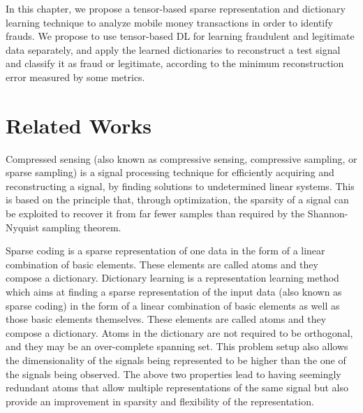 In this chapter, we propose a tensor-based sparse representation and dictionary learning technique to analyze mobile money transactions in order to identify frauds. We propose to use tensor-based DL for learning fraudulent and legitimate data separately, and apply the learned dictionaries to reconstruct a test signal and classify it as fraud or legitimate, according to the minimum reconstruction error measured by some metrics.


\section{Related Works}
\label{sec:4_relatedworks}


Compressed sensing (also known as compressive sensing, compressive sampling, or sparse sampling) is a signal processing technique for efficiently acquiring and reconstructing a signal, by finding solutions to undetermined linear systems. This is based on the principle that, through optimization, the sparsity of a signal can be exploited to recover it from far fewer samples than required by the Shannon-Nyquist sampling theorem. 


Sparse coding is a sparse representation of one data in the form of a linear combination of basic elements. These elements are called atoms and they compose a dictionary. Dictionary learning is a representation learning method which aims at finding a sparse representation of the input data (also known as sparse coding) in the form of a linear combination of basic elements as well as those basic elements themselves. These elements are called atoms and they compose a dictionary. Atoms in the dictionary are not required to be orthogonal, and they may be an over-complete spanning set. This problem setup also allows the dimensionality of the signals being represented to be higher than the one of the signals being observed. The above two properties lead to having seemingly redundant atoms that allow multiple representations of the same signal but also provide an improvement in sparsity and flexibility of the representation.

